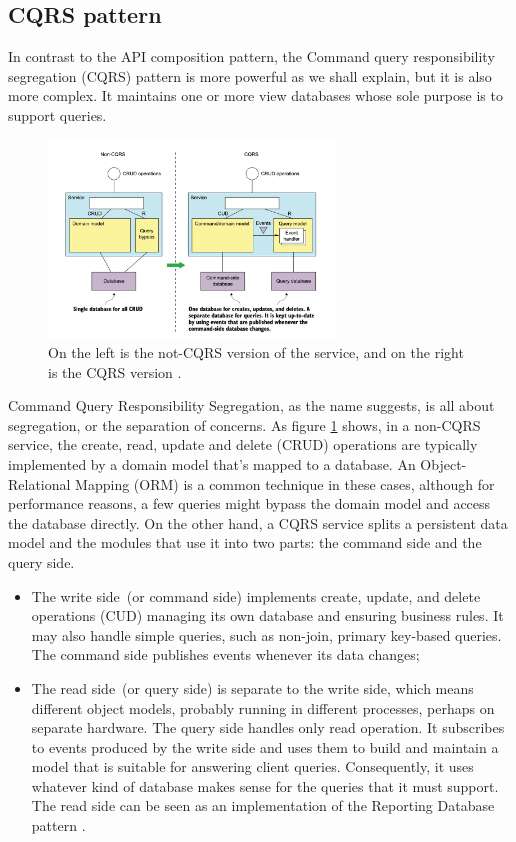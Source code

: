 \documentclass[conference]{IEEEtran}
\begin{document}
\subsection{CQRS pattern}

In contrast to the API composition pattern, the Command query responsibility segregation (CQRS) pattern \cite{cqrs-fowler} is more powerful as we shall explain, but it is also more complex. It maintains one or more view databases whose sole purpose is to support queries.

\begin{figure}[!htbp]
\centering
\includegraphics[width=3in]{jpeg/cqrs}
\caption{On the left is the not-CQRS version of the service, and on the right is the CQRS version \cite{microservices-patterns-cqrs}.}
\label{cqrs}
\end{figure}

Command Query Responsibility Segregation, as the name suggests, is all about segregation, or the separation of concerns. As figure \ref{cqrs} shows, in a non-CQRS service, the create, read, update and delete (CRUD) operations are typically implemented by a domain model that's mapped to a database. An Object-Relational Mapping (ORM) \cite{orm} is a common technique in these cases, although for performance reasons, a few queries might bypass the domain model and access the database directly. On the other hand, a CQRS service splits a persistent data model and the modules that use it into two parts: the command side and the query side.

\begin{itemize}
  \item The write side (or command side) implements create, update, and delete operations (CUD) managing its own database and ensuring business rules. It may also handle simple queries, such as non-join, primary key-based queries. The command side publishes events whenever its data changes;
  \item The read side (or query side) is separate to the write side, which means different object models, probably running in different processes, perhaps on separate hardware. The query side handles only read operation. It subscribes to events produced by the write side and uses them to build and maintain a model that is suitable for answering client queries. Consequently, it uses whatever kind of database makes sense for the queries that it must support. The read side can be seen as an implementation of the Reporting Database pattern \cite{reporting-database}.
\end{itemize}
\end{document}
